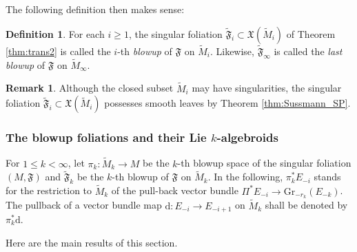 \documentclass[10pt]{article}
\theoremstyle{plain}
\theoremstyle{definition}
\newtheorem{definition}[lemma]{Definition}
\newtheorem{remark}[lemma]{Remark}
\theoremstyle{remark}
\newcommand{\dd}{\mathrm{d}}
\begin{document}
The following definition then makes sense:
\begin{definition}
   For each $i\geq 1$, the singular foliation $\widetilde{\mathfrak F}_i\subset\mathfrak X(\widetilde M_i)$ of Theorem \ref{thm:trans2} is called the $i$-th \emph{blowup} of $\mathfrak F$ on $\widetilde M_i$. Likewise, $\widetilde {\mathfrak F}_\infty$ is called the \emph{last blowup} of $\mathfrak F$ on $\widetilde M _\infty$. 
\end{definition}

\begin{remark}
    Although the closed subset $\widetilde M_i$ may have singularities, the singular foliation $\widetilde{\mathfrak F}_i\subset\mathfrak X(\widetilde M_i)$ possesses smooth leaves by Theorem \ref{thm:Sussmann_SP}.
\end{remark}

\noindent
\subsubsection{The blowup foliations and their Lie $k$-algebroids}

For $1\leq k<\infty$, let $\pi_k\colon \widetilde M_k\to M$ be the $k$-th blowup space of the singular foliation $(M,\mathfrak F)$ and $\widetilde{\mathfrak F}_k$ be the $k$-th blowup of $\mathfrak{F}$ on $\widetilde M_k$.  In the following, $\pi_k^*E_{-i}$ stands for the restriction to $\widetilde M_k$  of the pull-back vector bundle $\Pi^*E_{-i}\to \mathrm{Gr}_{-r_k}(E_{-k})$. The  pullback of a vector bundle map $\dd\colon E_{-i}\to E_{-i+1}$ on $\widetilde M_k$ shall be denoted by $\pi_k^*\dd$.



Here are the main results of this section. 
\end{document}
